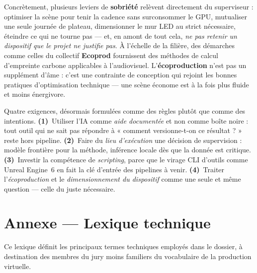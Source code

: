 \documentclass[11pt,a4paper]{report}
\begin{document}
Concrètement, plusieurs leviers de \textbf{sobriété} relèvent directement du superviseur :
optimiser la scène pour tenir la cadence sans surconsommer le GPU, mutualiser une seule journée
de plateau, dimensionner le mur LED au strict nécessaire, éteindre ce qui ne tourne pas --- et,
en amont de tout cela, \emph{ne pas retenir un dispositif que le projet ne justifie pas}. À
l'échelle de la filière, des démarches comme celles du collectif \textbf{Ecoprod}
\autocite{ecoprod} fournissent des méthodes de calcul d'empreinte carbone applicables à
l'audiovisuel. L'\textbf{écoproduction} n'est pas un supplément d'âme : c'est une contrainte de
conception qui rejoint les bonnes pratiques d'optimisation technique --- une scène économe est
à la fois plus fluide et moins énergivore.

\begin{infobox}[title={Ce que je retiens pour ma pratique}]
Quatre exigences, désormais formulées comme des règles plutôt que comme des intentions.
\textbf{(1)}~Utiliser l'IA comme \emph{aide documentée} et non comme boîte noire : tout outil qui
ne sait pas répondre à « comment versionne-t-on ce résultat ? » reste hors pipeline.
\textbf{(2)}~Faire du \emph{lieu d'exécution} une décision de supervision : modèle frontière pour la
méthode, inférence locale dès que la donnée est critique. \textbf{(3)}~Investir la compétence de
\emph{scripting}, parce que le virage CLI d'outils comme Unreal Engine~6 en fait la clé d'entrée
des pipelines à venir. \textbf{(4)}~Traiter l'\emph{écoproduction} et le \emph{dimensionnement du
dispositif} comme une seule et même question --- celle du juste nécessaire.
\end{infobox}

\chapter{Annexe --- Lexique technique}
Ce lexique définit les principaux termes techniques employés dans le dossier, à destination des membres du jury moins familiers du vocabulaire de la production virtuelle.
\end{document}
